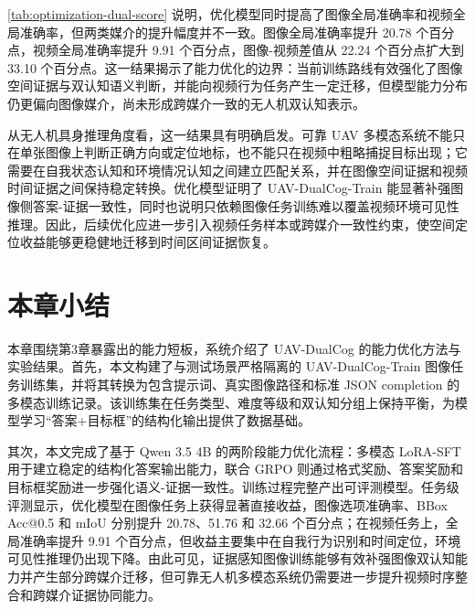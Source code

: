 \autoref{tab:optimization-dual-score} 说明，优化模型同时提高了图像全局准确率和视频全局准确率，但两类媒介的提升幅度并不一致。图像全局准确率提升 20.78 个百分点，视频全局准确率提升 9.91 个百分点，图像-视频差值从 22.24 个百分点扩大到 33.10 个百分点。这一结果揭示了能力优化的边界：当前训练路线有效强化了图像空间证据与双认知语义判断，并能向视频行为任务产生一定迁移，但模型能力分布仍更偏向图像媒介，尚未形成跨媒介一致的无人机双认知表示。

从无人机具身推理角度看，这一结果具有明确启发。可靠 UAV 多模态系统不能只在单张图像上判断正确方向或定位地标，也不能只在视频中粗略捕捉目标出现；它需要在自我状态认知和环境情况认知之间建立匹配关系，并在图像空间证据和视频时间证据之间保持稳定转换。优化模型证明了 UAV-DualCog-Train 能显著补强图像侧答案-证据一致性，同时也说明只依赖图像任务训练难以覆盖视频环境可见性推理。因此，后续优化应进一步引入视频任务样本或跨媒介一致性约束，使空间定位收益能够更稳健地迁移到时间区间证据恢复。

\section{本章小结}

本章围绕第3章暴露出的能力短板，系统介绍了 UAV-DualCog 的能力优化方法与实验结果。首先，本文构建了与测试场景严格隔离的 UAV-DualCog-Train 图像任务训练集，并将其转换为包含提示词、真实图像路径和标准 JSON completion 的多模态训练记录。该训练集在任务类型、难度等级和双认知分组上保持平衡，为模型学习“答案+目标框”的结构化输出提供了数据基础。

其次，本文完成了基于 Qwen 3.5 4B 的两阶段能力优化流程：多模态 LoRA-SFT 用于建立稳定的结构化答案输出能力，联合 GRPO 则通过格式奖励、答案奖励和目标框奖励进一步强化语义-证据一致性。训练过程完整产出可评测模型。任务级评测显示，优化模型在图像任务上获得显著直接收益，图像选项准确率、BBox Acc@0.5 和 mIoU 分别提升 20.78、51.76 和 32.66 个百分点；在视频任务上，全局准确率提升 9.91 个百分点，但收益主要集中在自我行为识别和时间定位，环境可见性推理仍出现下降。由此可见，证据感知图像训练能够有效补强图像双认知能力并产生部分跨媒介迁移，但可靠无人机多模态系统仍需要进一步提升视频时序整合和跨媒介证据协同能力。
